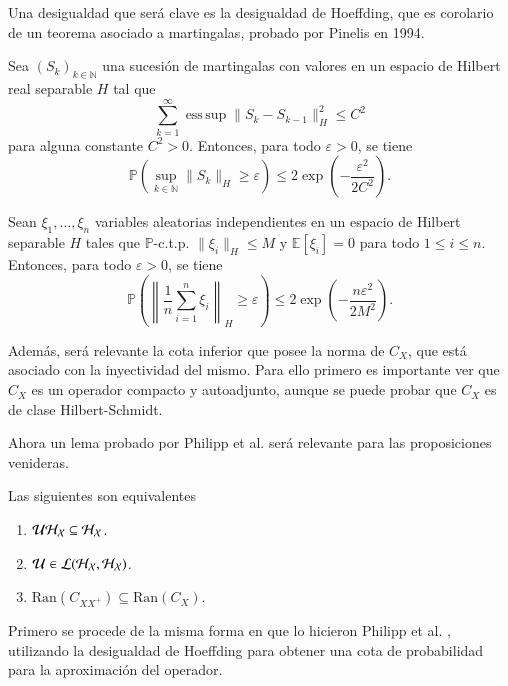 Una desigualdad que será clave es la desigualdad de Hoeffding, que es corolario de un teorema asociado a martingalas, probado por Pinelis en 1994.

\begin{teo}
Sea $(S_k)_{k \in \mathbb{N}}$ una sucesión de martingalas con valores en un espacio de Hilbert real separable $H$ tal que 
\[
\sum_{k=1}^\infty \operatorname{ess\,sup} \|S_k - S_{k-1}\|_H^2 \leq C^2
\]
para alguna constante $C^2 > 0$. Entonces, para todo $\varepsilon > 0$, se tiene
\[
\mathbb{P} \left( \sup_{k \in \mathbb{N}} \|S_k\|_H \geq \varepsilon \right) \leq 2 \exp \left( -\frac{\varepsilon^2}{2C^2} \right).
\]
\end{teo}

\begin{cor}
Sean $\xi_1, \dots, \xi_n$ variables aleatorias independientes en un espacio de Hilbert separable $H$ tales que $\mathbb{P}$-c.t.p. $\|\xi_i\|_H \leq M$ y $\mathbb{E}[\xi_i] = 0$ para todo $1 \leq i \leq n$. Entonces, para todo $\varepsilon > 0$, se tiene
\[
\mathbb{P} \left( \left\| \frac{1}{n} \sum_{i=1}^n \xi_i \right\|_H \geq \varepsilon \right) \leq 2 \exp \left( -\frac{n\varepsilon^2}{2M^2} \right).
\]
\end{cor}

Además, será relevante la cota inferior que posee la norma de $C_X$, que está asociado con la inyectividad del mismo. Para ello primero es importante ver que $C_X$ es un operador compacto y autoadjunto, aunque se puede probar que $C_X$ es de clase Hilbert-Schmidt.

Ahora un lema probado por Philipp et al. \cite{Philipp2024ErrorOperator} será relevante para las proposiciones venideras.

\begin{lema}
    Las siguientes son equivalentes
    \begin{enumerate}
        \item $\mathcal{U} \mathcal{H}_{\mathcal{X}} \subseteq \mathcal{H}_{\mathcal{X}}$.
        \item $\mathcal{U} \in \mathcal{L}(\mathcal{H}_{\mathcal{X}}, \mathcal{H}_{\mathcal{X}})$.
        \item $\text{Ran}(C_{XX^+}) \subseteq \text{Ran}(C_X).$
    \end{enumerate}
\end{lema}

Primero se procede de la misma forma en que lo hicieron Philipp et al. \cite{Philipp2024ErrorOperator}, utilizando la desigualdad de Hoeffding para obtener una cota de probabilidad para la aproximación del operador.

